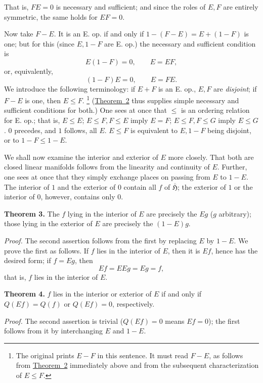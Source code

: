 \documentclass[fontsize=13pt,paper=b5,twoside,bookmarkpackage=false]{scrartcl}
\newcounter{translatornote}
\newcommand{\tnote}[1]{%
  \begingroup\stepcounter{translatornote}%
  \renewcommand{\thefootnote}{T\arabic{translatornote}}%
  \footnote[0]{#1}\endgroup}
\begin{document}
That is, $FE=0$ is necessary and sufficient; and since the roles of $E,F$ are entirely symmetric, the same holds for $EF=0$.

Now take $F-E$. It is an E. op. if and only if $1-(F-E)=E+(1-F)$ is one; but for this (since $E,1-F$ are E. op.) the necessary and sufficient condition is
\[
 E(1-F)=0,\qquad E=EF,
\]
or, equivalently,
\[
 (1-F)E=0,\qquad E=FE.
\]
We introduce the following terminology: if $E+F$ is an E. op., $E,F$ are \emph{disjoint}; if $F-E$ is one, then $E\leq F$.\tnote{The original prints $E-F$ in this sentence. It must read $F-E$, as follows from \hyperref[thm:VIII:2]{Theorem~2} immediately above and from the subsequent characterization of $E\leq F$.} (\hyperref[thm:VIII:2]{Theorem~2} thus supplies simple necessary and sufficient conditions for both.) One sees at once that $\leq$ is an ordering relation for E. op.; that is, $E\leq E$; $E\leq F,F\leq E$ imply $E=F$; $E\leq F,F\leq G$ imply $E\leq G$. $0$ precedes, and $1$ follows, all $E$. $E\leq F$ is equivalent to $E,1-F$ being disjoint, or to $1-F\leq1-E$.

We shall now examine the interior and exterior of $E$ more closely. That both are closed linear manifolds follows from the linearity and continuity of $E$. Further, one sees at once that they simply exchange places on passing from $E$ to $1-E$. The interior of $1$ and the exterior of $0$ contain all $f$ of $\overline{\mathfrak{H}}$; the exterior of $1$ or the interior of $0$, however, contains only $0$.

\par\medskip\noindent{}\label{thm:VIII:3}\textbf{Theorem 3.}
The $f$ lying in the interior of $E$ are precisely the $Eg$ ($g$ arbitrary); those lying in the exterior of $E$ are precisely the $(1-E)g$.

\par\noindent\textit{Proof.}
The second assertion follows from the first by replacing $E$ by $1-E$. We prove the first as follows. If $f$ lies in the interior of $E$, then it is $Ef$, hence has the desired form; if $f=Eg$, then
\[
 Ef=EEg=Eg=f,
\]
that is, $f$ lies in the interior of $E$.

\par\medskip\noindent{}\label{thm:VIII:4}\textbf{Theorem 4.}
$f$ lies in the interior or exterior of $E$ if and only if $Q(Ef)=Q(f)$ or $Q(Ef)=0$, respectively.

\par\noindent\textit{Proof.}
The second assertion is trivial ($Q(Ef)=0$ means $Ef=0$); the first follows from it by interchanging $E$ and $1-E$.
\end{document}
